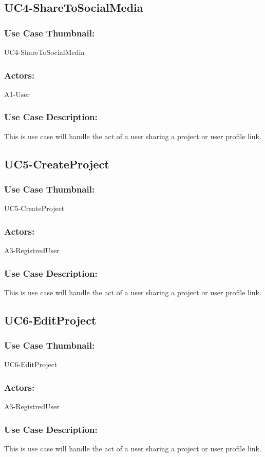 \documentclass[11pt, openany]{report}
\begin{document}
\subsection{UC4-ShareToSocialMedia}
\label{sUC4}
\subsubsection*{Use Case Thumbnail:}
UC4-ShareToSocialMedia
\subsubsection*{Actors:}
A1-User
\subsubsection*{Use Case Description:}
This is use case will handle the act of a user sharing a project or user profile link.

\subsection{UC5-CreateProject}
\label{sUC5}
\subsubsection*{Use Case Thumbnail:}
UC5-CreateProject
\subsubsection*{Actors:}
A3-RegistredUser
\subsubsection*{Use Case Description:}
This is use case will handle the act of a user sharing a project or user profile link.

\subsection{UC6-EditProject}
\label{sUC6}
\subsubsection*{Use Case Thumbnail:}
UC6-EditProject
\subsubsection*{Actors:}
A3-RegistredUser
\subsubsection*{Use Case Description:}
This is use case will handle the act of a user sharing a project or user profile link.
\end{document}
